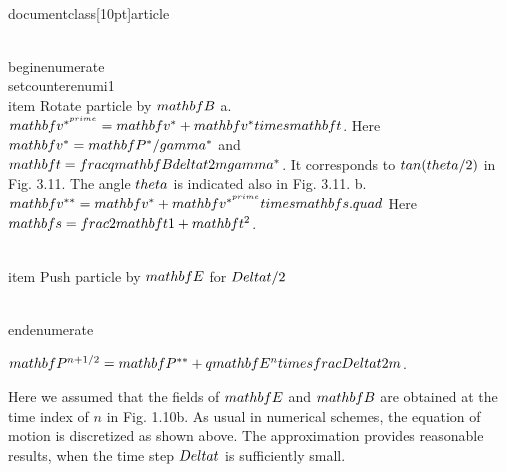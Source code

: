 \\documentclass[10pt]{article}
\begin{document}
\\begin{enumerate}
  \\setcounter{enumi}{1}
  \\item Rotate particle by $\\mathbf{B}$
a. $\\mathbf{v}^{*^{\\prime}}=\\mathbf{v}^{*}+\\mathbf{v}^{*} \\times \\mathbf{t}$. Here $\\mathbf{v}^{*}=\\mathbf{P}^{*} / \\gamma^{*}$ and $\\mathbf{t}=\\frac{q \\mathbf{B} \\delta t}{2 m \\gamma^{*}}$. It corresponds to $\\tan (\\theta / 2)$ in Fig. 3.11. The angle $\\theta$ is indicated also in Fig. 3.11.
b. $\\mathbf{v}^{* *}=\\mathbf{v}^{*}+\\mathbf{v}^{*^{\\prime}} \\times \\mathbf{s} . \\quad$ Here $\\mathbf{s}=\\frac{2 \\mathbf{t}}{1+\\mathbf{t}^{2}}$.

  \\item Push particle by $\\mathbf{E}$ for $\\Delta t / 2$

\\end{enumerate}

$\\mathbf{P}^{n+1 / 2}=\\mathbf{P}^{* *}+q \\mathbf{E}^{n} \\times \\frac{\\Delta t}{2 m}$.

Here we assumed that the fields of $\\mathbf{E}$ and $\\mathbf{B}$ are obtained at the time index of $n$ in Fig. 1.10b. As usual in numerical schemes, the equation of motion is discretized as shown above. The approximation provides reasonable results, when the time step $\\Delta t$ is sufficiently small.
\end{document}
